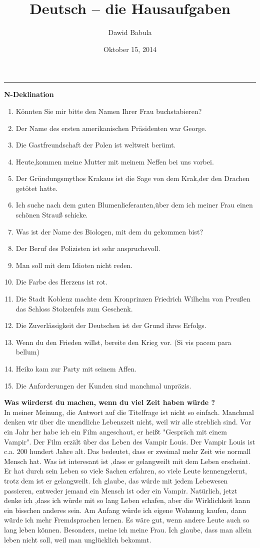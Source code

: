 \documentclass[a4paper,12pt]{article}
\author{Dawid Babula}
\title{Deutsch -- die Hausaufgaben}
\date{Oktober 15, 2014}
\makeatletter
\def\thickhrulefill{\leavevmode \leaders \hrule height 1pt\hfill \kern \z@}
\def\maketitle{%
    \null
    \thispagestyle{empty}%
    \vfill
    \begin{center}\leavevmode
    \normalfont
    {\LARGE\raggedleft \@author\par}%
    \thickhrulefill\par
    {\huge\raggedright \@title\par}%
    \vskip 1cm
    \end{center}%
    \vfill
    {\Large \@date\par}%
    \null
    \cleardoublepage
    }
\makeatother
\begin{document}
\maketitle

\textbf{\large N-Deklination}
\vspace{2pc}
\begin{enumerate}
    \item K\"onnten Sie mir bitte den Namen Ihrer Frau buchstabieren?
    \item Der Name des ersten amerikanischen Pr\"asidenten war George.
    \item Die Gastfreundschaft der Polen ist weltweit ber\"umt.
    \item Heute,kommen meine Mutter mit meinem Neffen bei uns vorbei.
    \item Der Gr\"undungsmythos Krakaus ist die Sage von dem Krak,der den Drachen get\"otet hatte.
    \item Ich suche nach dem guten Blumenlieferanten,\"uber dem ich meiner Frau einen sch\"onen Strau{\ss} schicke.
    \item Was ist der Name des Biologen, mit dem du gekommen bist?
    \item Der Beruf des Polizisten ist sehr anspruchsvoll.
    \item Man soll mit dem Idioten nicht reden.
    \item Die Farbe des Herzens ist rot.
    \item Die Stadt Koblenz machte dem Kronprinzen Friedrich Wilhelm von Preu{\ss}en das Schloss Stolzenfels zum Geschenk.
    \item Die Zuverl\"assigkeit der Deutschen ist der Grund ihres Erfolgs.
    \item Wenn du den Frieden willst, bereite den Krieg vor. (Si vis pacem para bellum)
    \item Heiko kam zur Party mit seinem Affen.
    \item Die Anforderungen der Kunden sind manchmal unpr\"azis.
\end{enumerate}
\newpage
\textbf{\large Was w\"urderst du machen, wenn du viel Zeit haben w\"urde ?}
\vspace{2pc}
\\{}
In meiner Meinung, die Antwort auf die Titelfrage ist nicht so einfach. Manchmal denken wir \"uber die unendliche Lebenszeit nicht, weil wir alle streblich sind.
Vor ein Jahr her habe ich ein Film angeschaut, er hei{\ss}t "Gespr\"ach mit einem Vampir". Der Film erz\"alt \"uber das Leben des Vampir Louis. Der Vampir Louis ist
c.a. 200 hundert Jahre alt. Das bedeutet, dass er zweimal mehr Zeit wie normall Mensch hat. Was ist interesant ist ,dass er gelangweilt mit dem Leben erscheint.
Er hat durch sein Leben so viele Sachen erfahren, so viele Leute kennengelernt, trotz dem ist er gelangweilt. Ich glaube, das w\'urde mit jedem Lebewesen passieren, entweder
jemand ein Mensch ist oder ein Vampir. Nat\"urlich, jetzt denke ich ,dass ich w\"urde mit so lang Leben schafen, aber die Wirklichkeit kann ein bisschen anderes sein.
Am Anfang w\"urde ich eigene Wohnung kaufen, dann w\"urde ich mehr Fremdsprachen lernen. Es w\"are gut, wenn andere Leute auch so lang leben k\"onnen. Besonders, meine ich meine
Frau. Ich glaube, dass man allein leben nicht soll, weil man ungl\"ucklich bekommt.
\end{document}

